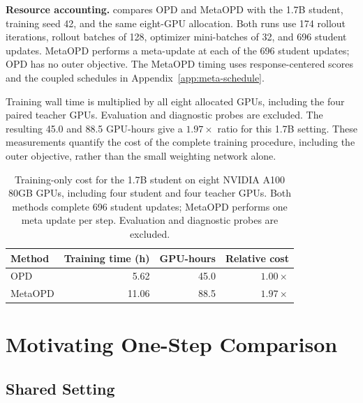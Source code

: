 \documentclass{article}
\theoremstyle{plain}
\theoremstyle{definition}
\theoremstyle{remark}
\begin{document}


\textbf{Resource accounting.}
 compares OPD and MetaOPD with the 1.7B student, training seed 42, and the same eight-GPU allocation. Both runs use 174 rollout iterations, rollout batches of 128, optimizer mini-batches of 32, and 696 student updates. MetaOPD performs a meta-update at each of the 696 student updates; OPD has no outer objective. The MetaOPD timing uses response-centered scores and the coupled schedules in Appendix~\ref{app:meta-schedule}.

Training wall time is multiplied by all eight allocated GPUs, including the four paired teacher GPUs. Evaluation and diagnostic probes are excluded. The resulting 45.0 and 88.5 GPU-hours give a \(1.97\times\) ratio for this 1.7B setting. These measurements quantify the cost of the complete training procedure, including the outer objective, rather than the small weighting network alone.


\begin{table}[htbp]
\centering
\small
\caption{Training-only cost for the 1.7B student on eight NVIDIA A100 80GB GPUs, including four student and four teacher GPUs. Both methods complete 696 student updates; MetaOPD performs one meta update per step. Evaluation and diagnostic probes are excluded.}
\label{tab:metaopd-resource}
\begin{tabular}{@{}lrrr@{}}
\toprule
Method & Training time (h) & GPU-hours & Relative cost \\
\midrule
OPD & 5.62 & 45.0 & \(1.00\times\) \\
MetaOPD & 11.06 & 88.5 & \(1.97\times\) \\
\bottomrule
\end{tabular}
\end{table}



\section{Motivating One-Step Comparison}
\label{app:intro-motivation-diagnostic}

\subsection{Shared Setting}
\end{document}
